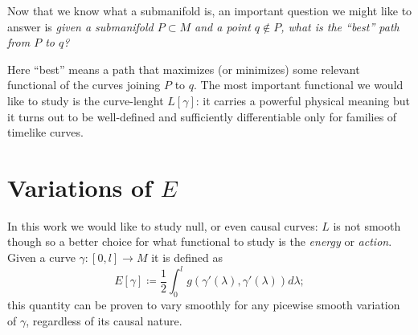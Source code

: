 
Now that we know what a submanifold is, an important question we might like to answer is \emph{given a submanifold \(P\subset M\) and a point \(q \notin P\), what is the ``best'' path from \(P\) to \(q\)?} 

Here ``best'' means a path that maximizes (or minimizes) some relevant functional of the curves joining \(P\) to \(q\). The most important functional we would like to study is the curve-lenght \(L[\gamma]\): it carries a powerful physical meaning but it turns out to be well-defined and sufficiently differentiable only for families of timelike curves. 


\section{Variations of \(E\)}

In this work we would like to study null, or even causal curves: \(L\) is not smooth though so a better choice for what functional to study is the \emph{energy} or \emph{action}. Given a curve \(\gamma : [0, l] \rightarrow M\) it is defined as
\begin{equation*}
E[\gamma] \coloneqq \frac{1}{2}\int_{0}^{l} g(\gamma'(\lambda), \gamma'(\lambda))d\lambda;
\end{equation*}
this quantity can be proven to vary smoothly for any picewise smooth variation of \(\gamma\), regardless of its causal nature.

%

